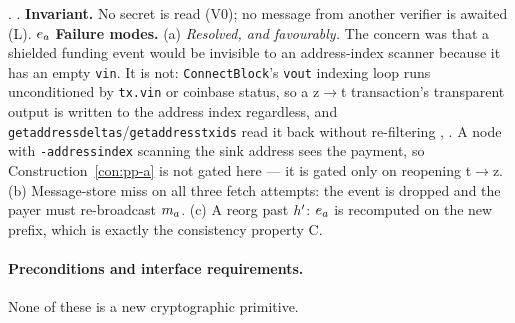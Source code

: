 \begin{palgorithm}[H]
\caption{$\mathsf{Verify}_u(\app, \hgt, C_{\le\hgt})$ --- node side. \shipped{} for transparent
funding events; the shielded case is covered by the same scan (interface I1, M5 resolved).}
\label{alg:pp-verify}
\DontPrintSemicolon
{}.
.
\medskip\noindent \textbf{Invariant.} No secret is read (V0); no message from another verifier is awaited (L).\medskip
{}
\Return{} $e_{a}$\;
\medskip\noindent \textbf{Failure modes.} (a) \emph{Resolved, and favourably.} The concern was that a shielded funding event would be invisible to an address-index scanner because it has an empty \texttt{vin}. It is not: \texttt{ConnectBlock}'s \texttt{vout} indexing loop runs unconditioned by \texttt{tx.vin} or coinbase status, so a z$\to$t transaction's transparent output is written to the address index regardless, and \texttt{getaddressdeltas}\slash\texttt{getaddresstxids} read it back without re-filtering , . A node with \texttt{-addressindex} scanning the sink address sees the payment, so Construction~\ref{con:pp-a} is not gated here --- it is gated only on reopening t$\to$z. (b) Message-store miss on all three fetch attempts: the event is dropped and the payer must re-broadcast $m_{a}$. (c) A reorg past $h'$: $e_{a}$ is recomputed on the new prefix, which is exactly the consistency property C.\medskip
\end{palgorithm}

\paragraph{Preconditions and interface requirements.} None of these is a new cryptographic primitive.

